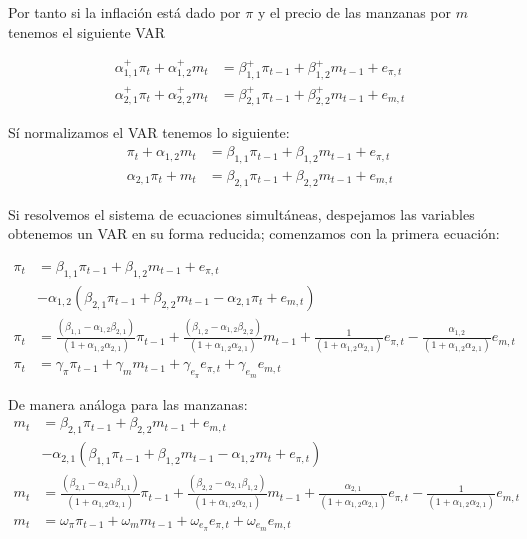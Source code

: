 \documentclass[
]{book}
\begin{document}
Por tanto si la inflación está dado por \(\pi\) y el precio de las manzanas por \(m\) tenemos el siguiente VAR

\begin{align}
\alpha_{1,1}^{+}\pi_t+\alpha_{1,2}^{+}m_t &= \beta_{1,1}^{+}\pi_{t-1}+\beta_{1,2}^{+}m_{t-1}+e_{\pi,t}\\
\alpha_{2,1}^{+}\pi_t+\alpha_{2,2}^{+}m_t &= \beta_{2,1}^{+}\pi_{t-1}+\beta_{2,2}^{+}m_{t-1}+e_{m,t}
\end{align}

Sí normalizamos el VAR tenemos lo siguiente:
\begin{align}
\pi_t+\alpha_{1,2}m_t &= \beta_{1,1}\pi_{t-1}+\beta_{1,2}m_{t-1}+e_{\pi,t}\\
\alpha_{2,1}\pi_t+m_t &= \beta_{2,1}\pi_{t-1}+\beta_{2,2}m_{t-1}+e_{m,t}
\end{align}

Si resolvemos el sistema de ecuaciones simultáneas, despejamos las
variables obtenemos un VAR en su forma reducida; comenzamos con la primera ecuación:

\begin{align}
\pi_{t} &=\beta_{1,1}\pi_{t-1}+\beta_{1,2}m_{t-1}+e_{\pi,t}\\
        &- \alpha_{1,2}(\beta_{2,1}\pi_{t-1}+\beta_{2,2}m_{t-1}-\alpha_{2,1}\pi_t+e_{m,t})\\
        \pi_{t} &=\frac{(\beta_{1,1}-\alpha_{1,2}\beta_{2,1})}{(1+\alpha_{1,2}\alpha_{2,1})}\pi_{t-1}+ \frac{(\beta_{1,2}-\alpha_{1,2}\beta_{2,2})}{(1+\alpha_{1,2}\alpha_{2,1})}m_{t-1}+\frac{1}{(1+\alpha_{1,2}\alpha_{2,1})}e_{\pi,t}- \frac{\alpha_{1,2}}{(1+\alpha_{1,2}\alpha_{2,1})}e_{m,t}\\
 \pi_{t}&=\gamma_{\pi}\pi_{t-1}+\gamma_{m}m_{t-1}+\gamma_{e_{\pi}}e_{\pi,t}+\gamma_{e_{m}}e_{m,t}       
\end{align}

De manera análoga para las manzanas:
\begin{align}
m_{t} &=\beta_{2,1}\pi_{t-1}+\beta_{2,2}m_{t-1}+e_{m,t}\\
        &- \alpha_{2,1}(\beta_{1,1}\pi_{t-1}+\beta_{1,2}m_{t-1}-\alpha_{1,2}m_t+e_{\pi,t})\\
        m_{t} &=\frac{(\beta_{2,1}-\alpha_{2,1}\beta_{1,1})}{(1+\alpha_{1,2}\alpha_{2,1})}\pi_{t-1}+ \frac{(\beta_{2,2}-\alpha_{2,1}\beta_{1,2})}{(1+\alpha_{1,2}\alpha_{2,1})}m_{t-1}+\frac{\alpha_{2,1}}{(1+\alpha_{1,2}\alpha_{2,1})}e_{\pi,t}- \frac{1}{(1+\alpha_{1,2}\alpha_{2,1})}e_{m,t}\\
 m_{t}&=\omega_{\pi}\pi_{t-1}+\omega_{m}m_{t-1}+\omega_{e_{\pi}}e_{\pi,t}+\omega_{e_{m}}e_{m,t}       
\end{align}
\end{document}
